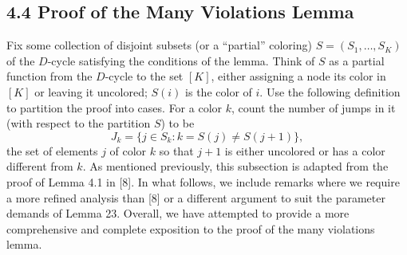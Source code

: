 \subsection*{4.4 Proof of the Many Violations Lemma}
Fix some collection of disjoint subsets (or a ``partial'' coloring) $S=(S_1,\ldots,S_K)$ of the $D$-cycle satisfying the conditions of the lemma. Think of $S$ as a partial function from the $D$-cycle to the set $[K]$, either assigning a node its color in $[K]$ or leaving it uncolored; $S(i)$ is the color of $i$. Use the following definition to partition the proof into cases. For a color $k$, count the number of jumps in it (with respect to the partition $S$) to be
\[J_k=\{j\in S_k:k=S(j)\neq S(j+1)\},\]
the set of elements $j$ of color $k$ so that $j+1$ is either uncolored or has a color different from $k$. As mentioned previously, this subsection is adapted from the proof of Lemma 4.1 in [8]. In what follows, we include remarks where we require a more refined analysis than [8] or a different argument to suit the parameter demands of Lemma 23. Overall, we have attempted to provide a more comprehensive and complete exposition to the proof of the many violations lemma.
